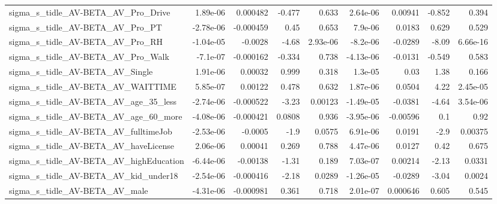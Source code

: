 \begin{tabular}{lrrrrrrrr}
sigma\_s\_tidle\_AV-BETA\_AV\_Pro\_Drive                 &    1.89e-06 &     0.000482 &    -0.477 &    0.633 &   2.64e-06 &     0.00941 &       -0.852 &         0.394 \\
sigma\_s\_tidle\_AV-BETA\_AV\_Pro\_PT                    &   -2.78e-06 &    -0.000459 &      0.45 &    0.653 &    7.9e-06 &      0.0183 &        0.629 &         0.529 \\
sigma\_s\_tidle\_AV-BETA\_AV\_Pro\_RH                    &   -1.04e-05 &      -0.0028 &     -4.68 & 2.93e-06 &   -8.2e-06 &     -0.0289 &        -8.09 &      6.66e-16 \\
sigma\_s\_tidle\_AV-BETA\_AV\_Pro\_Walk                  &    -7.1e-07 &    -0.000162 &    -0.334 &    0.738 &  -4.13e-06 &     -0.0131 &       -0.549 &         0.583 \\
sigma\_s\_tidle\_AV-BETA\_AV\_Single                    &    1.91e-06 &      0.00032 &     0.999 &    0.318 &    1.3e-05 &        0.03 &         1.38 &         0.166 \\
sigma\_s\_tidle\_AV-BETA\_AV\_WAITTIME                  &    5.85e-07 &      0.00122 &     0.478 &    0.632 &   1.87e-06 &      0.0504 &         4.22 &      2.45e-05 \\
sigma\_s\_tidle\_AV-BETA\_AV\_age\_35\_less               &   -2.74e-06 &    -0.000522 &     -3.23 &  0.00123 &  -1.49e-05 &     -0.0381 &        -4.64 &      3.54e-06 \\
sigma\_s\_tidle\_AV-BETA\_AV\_age\_60\_more               &   -4.08e-06 &    -0.000421 &    0.0808 &    0.936 &  -3.95e-06 &    -0.00596 &          0.1 &          0.92 \\
sigma\_s\_tidle\_AV-BETA\_AV\_fulltimeJob               &   -2.53e-06 &      -0.0005 &      -1.9 &   0.0575 &   6.91e-06 &      0.0191 &         -2.9 &       0.00375 \\
sigma\_s\_tidle\_AV-BETA\_AV\_haveLicense               &    2.06e-06 &      0.00041 &     0.269 &    0.788 &   4.47e-06 &      0.0127 &         0.42 &         0.675 \\
sigma\_s\_tidle\_AV-BETA\_AV\_highEducation             &   -6.44e-06 &     -0.00138 &     -1.31 &    0.189 &   7.03e-07 &     0.00214 &        -2.13 &        0.0331 \\
sigma\_s\_tidle\_AV-BETA\_AV\_kid\_under18               &   -2.54e-06 &    -0.000416 &     -2.18 &   0.0289 &  -1.26e-05 &     -0.0289 &        -3.04 &        0.0024 \\
sigma\_s\_tidle\_AV-BETA\_AV\_male                      &   -4.31e-06 &    -0.000981 &     0.361 &    0.718 &   2.01e-07 &    0.000646 &        0.605 &         0.545 \\

\end{tabular}
